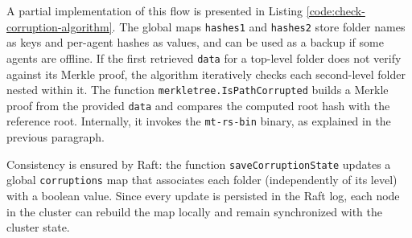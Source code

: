 A partial implementation of this flow is presented in Listing
\ref{code:check-corruption-algorithm}. The global maps \texttt{hashes1} and
\texttt{hashes2} store folder names as keys and per-agent hashes as values, and
can be used as a backup if some agents are offline. If the first retrieved
\texttt{data} for a top-level folder does not verify against its Merkle proof,
the algorithm iteratively checks each second-level folder nested within it. The
function \texttt{merkletree.IsPathCorrupted} builds a Merkle proof from the
provided \texttt{data} and compares the computed root hash with the reference
root. Internally, it invokes the \texttt{mt-rs-bin} binary, as explained in the
previous paragraph.

Consistency is ensured by Raft: the function \texttt{saveCorruptionState} updates
a global \texttt{corruptions} map that associates each folder (independently of
its level) with a boolean value. Since every update is persisted in the Raft
log, each node in the cluster can rebuild the map locally and remain synchronized
with the cluster state.


